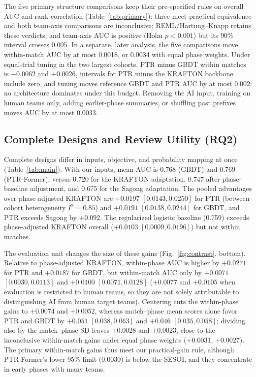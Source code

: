 \documentclass[sigconf,anonymous]{acmart}
\begin{document}

The five primary structure comparisons keep their pre-specified rules on overall AUC and rank correlation (Table~\ref{tab:primary}): three meet practical equivalence and both team-axis comparisons are inconclusive; REML/Hartung--Knapp retains these verdicts, and team-axis AUC is positive (Holm $p<0.001$) but its 90\% interval crosses 0.005. In a separate, later analysis, the five comparisons move within-match AUC by at most 0.0018, or 0.0034 with equal phase weights. Under equal-trial tuning in the two largest cohorts, PTR minus GBDT within matches is $-0.0062$ and $+0.0026$, intervals for PTR minus the KRAFTON backbone include zero, and tuning moves reference GBDT and PTR AUC by at most 0.002: no architecture dominates under this budget. Removing the AI input, training on human teams only, adding earlier-phase summaries, or shuffling past prefixes moves AUC by at most 0.0033.

\subsection{Complete Designs and Review Utility (RQ2)}
\label{sec:results:designs}

Complete designs differ in inputs, objective, and probability mapping at once (Table~\ref{tab:main}). With our inputs, mean AUC is 0.768 (GBDT) and 0.769 (PTR-Former), versus 0.720 for the KRAFTON adaptation, 0.747 after phase-baseline adjustment, and 0.675 for the Sagong adaptation. The pooled advantages over phase-adjusted KRAFTON are $+0.0197$ $[0.0143,\allowbreak 0.0250]$ for PTR (between-cohort heterogeneity $I^2=0.85$) and $+0.0191$ $[0.0138,\allowbreak 0.0244]$ for GBDT, and PTR exceeds Sagong by $+0.092$. The regularized logistic baseline (0.759) exceeds phase-adjusted KRAFTON overall ($+0.0103$ $[0.0009,\allowbreak 0.0196]$) but not within matches.

The evaluation unit changes the size of these gains (Fig.~\ref{fig:contrast}, bottom). Relative to phase-adjusted KRAFTON, within-phase AUC is higher by $+0.0271$ for PTR and $+0.0187$ for GBDT, but within-match AUC only by $+0.0071$ $[0.0030,\allowbreak 0.0113]$ and $+0.0100$ $[0.0071,\allowbreak 0.0128]$ ($+0.0077$ and $+0.0105$ when evaluation is restricted to human teams, so they are not solely attributable to distinguishing AI from human target teams). Centering cuts the within-phase gains to $+0.0074$ and $+0.0052$, whereas match--phase mean scores alone favor PTR and GBDT by $+0.051$ $[0.038,\allowbreak 0.063]$ and $+0.046$ $[0.035,\allowbreak 0.058]$; dividing also by the match--phase SD leaves $+0.0028$ and $+0.0023$, close to the inconclusive within-match gains under equal phase weights ($+0.0031$, $+0.0027$). The primary within-match gains thus meet our practical-gain rule, although PTR-Former's lower 95\% limit (0.0030) is below the SESOI, and they concentrate in early phases with many teams.
\end{document}
